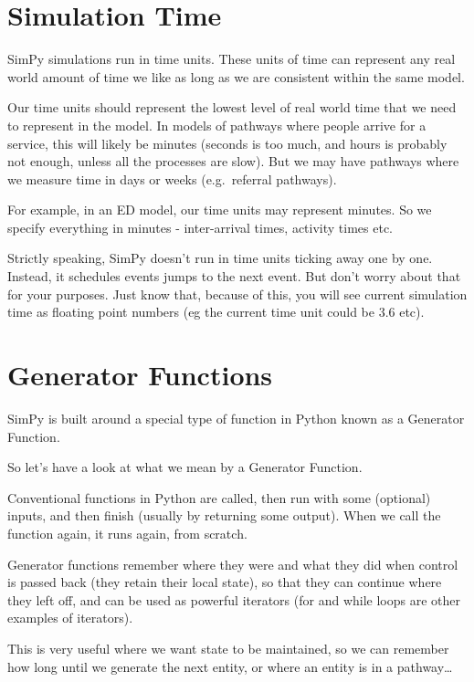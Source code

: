 \documentclass[
  letterpaper,
  DIV=11,
  numbers=noendperiod]{scrreprt}
\begin{document}
\section{Simulation Time}\label{simulation-time}

SimPy simulations run in time units. These units of time can represent
any real world amount of time we like as long as we are consistent
within the same model.

Our time units should represent the lowest level of real world time that
we need to represent in the model. In models of pathways where people
arrive for a service, this will likely be minutes (seconds is too much,
and hours is probably not enough, unless all the processes are slow).
But we may have pathways where we measure time in days or weeks
(e.g.~referral pathways).

For example, in an ED model, our time units may represent minutes. So we
specify everything in minutes - inter-arrival times, activity times etc.

Strictly speaking, SimPy doesn't run in time units ticking away one by
one. Instead, it schedules events jumps to the next event. But don't
worry about that for your purposes. Just know that, because of this, you
will see current simulation time as floating point numbers (eg the
current time unit could be 3.6 etc).

\section{Generator Functions}\label{generator-functions}

SimPy is built around a special type of function in Python known as a
Generator Function.

So let's have a look at what we mean by a Generator Function.

Conventional functions in Python are called, then run with some
(optional) inputs, and then finish (usually by returning some output).
When we call the function again, it runs again, from scratch.

Generator functions remember where they were and what they did when
control is passed back (they retain their local state), so that they can
continue where they left off, and can be used as powerful iterators (for
and while loops are other examples of iterators).

This is very useful where we want state to be maintained, so we can
remember how long until we generate the next entity, or where an entity
is in a pathway\ldots{}
\end{document}
